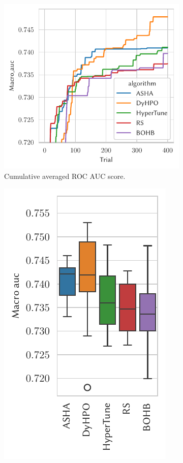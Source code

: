 \begin{figure}[H]
    \begin{subfigure}{.47\textwidth}
        \includegraphics[height=\plotheight]{img/real_exp/xray_densenet_plot.pdf}%
        \caption{Cumulative averaged ROC AUC score.}%
    \end{subfigure}%
    \begin{subfigure}{.26\textwidth}
        \includegraphics[height=\plotheight]{img/real_exp/xray_densenet_boxplot_half.pdf}%

\end{subfigure}
\end{figure}

